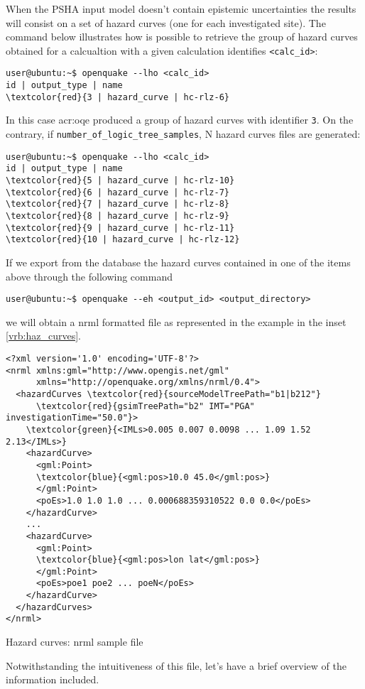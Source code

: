 When the PSHA input model doesn't contain epistemic uncertainties
the results will consist on a set of hazard curves (one for each 
investigated site). 
The command below illustrates how is possible to retrieve the group
of hazard curves obtained for a calcualtion with a given calculation
identifies \texttt{<calc\_id>}:
\begin{Verbatim}[frame=single, commandchars=\\\{\}, fontsize=\small]
user@ubuntu:~$ openquake --lho <calc_id>
id | output_type | name
\textcolor{red}{3 | hazard_curve | hc-rlz-6}
\end{Verbatim}
In this case \gls{acr:oqe} produced a group of hazard curves with 
identifier \texttt{3}.
% 
On the contrary, if \texttt{number\_of\_logic\_tree\_samples}, 
N hazard curves files are generated:
\begin{Verbatim}[frame=single, commandchars=\\\{\}, fontsize=\small]
user@ubuntu:~$ openquake --lho <calc_id>
id | output_type | name
\textcolor{red}{5 | hazard_curve | hc-rlz-10}
\textcolor{red}{6 | hazard_curve | hc-rlz-7}
\textcolor{red}{7 | hazard_curve | hc-rlz-8}
\textcolor{red}{8 | hazard_curve | hc-rlz-9}
\textcolor{red}{9 | hazard_curve | hc-rlz-11}
\textcolor{red}{10 | hazard_curve | hc-rlz-12}
\end{Verbatim}
If we export from the database the hazard curves contained in 
one of the items above through the following command
\begin{Verbatim}[frame=single, commandchars=\\\{\}, fontsize=\small]
user@ubuntu:~$ openquake --eh <output_id> <output_directory>
\end{Verbatim}
we will obtain a nrml formatted file as represented in the example
in the inset \ref{vrb:haz_curves}.
\begin{nrmlsmp}
\begin{Verbatim}[frame=single, commandchars=\\\{\}, fontsize=\small]
<?xml version='1.0' encoding='UTF-8'?>
<nrml xmlns:gml="http://www.opengis.net/gml" 
      xmlns="http://openquake.org/xmlns/nrml/0.4">
  <hazardCurves \textcolor{red}{sourceModelTreePath="b1|b212"} 
      \textcolor{red}{gsimTreePath="b2" IMT="PGA" investigationTime="50.0"}>
    \textcolor{green}{<IMLs>0.005 0.007 0.0098 ... 1.09 1.52 2.13</IMLs>}
    <hazardCurve>
      <gml:Point>
      \textcolor{blue}{<gml:pos>10.0 45.0</gml:pos>}
      </gml:Point>
      <poEs>1.0 1.0 1.0 ... 0.000688359310522 0.0 0.0</poEs>
    </hazardCurve>
    ...
    <hazardCurve>
      <gml:Point>
      \textcolor{blue}{<gml:pos>lon lat</gml:pos>}
      </gml:Point>
      <poEs>poe1 poe2 ... poeN</poEs>
    </hazardCurve>
  </hazardCurves>
</nrml>
\end{Verbatim}
\caption{Hazard curves: nrml sample file}
\label{vrb:haz_curves}
\end{nrmlsmp}
Not\-with\-stand\-ing the intuitiveness of this file, let's have a brief 
overview of the information included.

